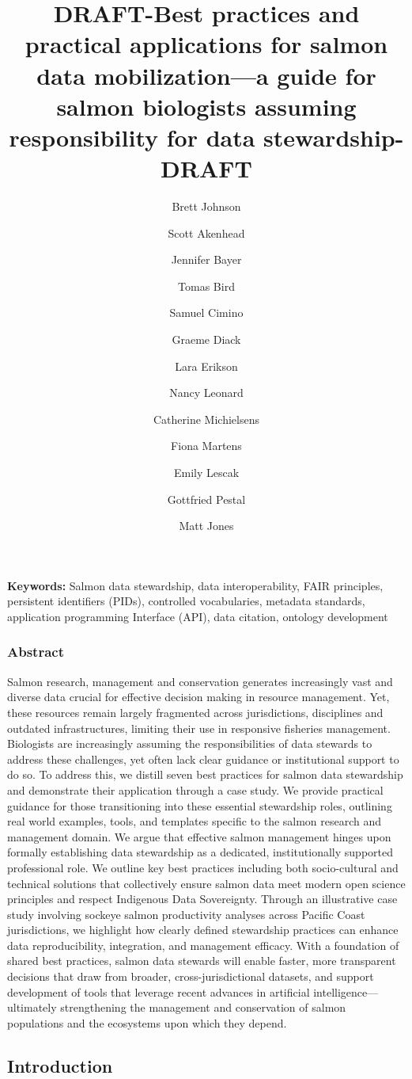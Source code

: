\documentclass[
  letterpaper,
  DIV=11,
  numbers=noendperiod]{scrartcl}
\title{DRAFT-Best practices and practical applications for salmon data
mobilization---a guide for salmon biologists assuming responsibility for
data stewardship-DRAFT}
\author{Brett Johnson \and Scott Akenhead \and Jennifer Bayer \and Tomas
Bird \and Samuel Cimino \and Graeme Diack \and Lara Erikson \and Nancy
Leonard \and Catherine Michielsens \and Fiona Martens \and Emily
Lescak \and Gottfried Pestal \and Matt Jones}
\date{}
\begin{document}
\maketitle


\textbf{Keywords:} Salmon data stewardship, data interoperability, FAIR
principles, persistent identifiers (PIDs), controlled vocabularies,
metadata standards, application programming Interface (API), data
citation, ontology development

\subsubsection{Abstract}\label{abstract}

Salmon research, management and conservation generates increasingly vast
and diverse data crucial for effective decision making in resource
management. Yet, these resources remain largely fragmented across
jurisdictions, disciplines and outdated infrastructures, limiting their
use in responsive fisheries management. Biologists are increasingly
assuming the responsibilities of data stewards to address these
challenges, yet often lack clear guidance or institutional support to do
so. To address this, we distill seven best practices for salmon data
stewardship and demonstrate their application through a case study. We
provide practical guidance for those transitioning into these essential
stewardship roles, outlining real world examples, tools, and templates
specific to the salmon research and management domain. We argue that
effective salmon management hinges upon formally establishing data
stewardship as a dedicated, institutionally supported professional role.
We outline key best practices including both socio-cultural and
technical solutions that collectively ensure salmon data meet modern
open science principles and respect Indigenous Data Sovereignty. Through
an illustrative case study involving sockeye salmon productivity
analyses across Pacific Coast jurisdictions, we highlight how clearly
defined stewardship practices can enhance data reproducibility,
integration, and management efficacy. With a foundation of shared best
practices, salmon data stewards will enable faster, more transparent
decisions that draw from broader, cross-jurisdictional datasets, and
support development of tools that leverage recent advances in artificial
intelligence---ultimately strengthening the management and conservation
of salmon populations and the ecosystems upon which they depend.

\subsection{Introduction}\label{introduction}
\end{document}
